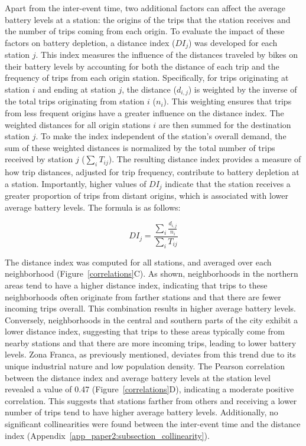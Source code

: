         Apart from the inter-event time, two additional factors can affect the average battery levels at a station: the origins of the trips that the station receives and the number of trips coming from each origin. To evaluate the impact of these factors on battery depletion, a distance index (\(DI_j\)) was developed for each station \( j \). This index measures the influence of the distances traveled by bikes on their battery levels by accounting for both the distance of each trip and the frequency of trips from each origin station. Specifically, for trips originating at station \( i \) and ending at station \( j \), the distance  (\( d_{i,j} \)) is weighted by the inverse of the total trips originating from station \( i \) (\( n_i \)). This weighting ensures that trips from less frequent origins have a greater influence on the distance index. The weighted distances for all origin stations \( i \) are then summed for the destination station \( j \). To make the index independent of the station’s overall demand, the sum of these weighted distances is normalized by the total number of trips received by station \( j \) (\( \sum_{i} T_{ij} \)). The resulting distance index provides a measure of how trip distances, adjusted for trip frequency, contribute to battery depletion at a station. Importantly, higher values of \(DI_j\) indicate that the station receives a greater proportion of trips from distant origins, which is associated with lower average battery levels. The formula is as follows:

        \begin{equation}
          DI_j = \frac{\sum_{i} \frac{d_{i,j}}{n_i}}{\sum_{i} T_{ij}}
        \end{equation}

        The distance index was computed for all stations, and averaged over each neighborhood (Figure~\ref{correlations}C). As shown, neighborhoods in the northern areas tend to have a higher distance index, indicating that trips to these neighborhoods often originate from farther stations and that there are fewer incoming trips overall. This combination results in higher average battery levels. Conversely, neighborhoods in the central and southern parts of the city exhibit a lower distance index, suggesting that trips to these areas typically come from nearby stations and that there are more incoming trips, leading to lower battery levels. Zona Franca, as previously mentioned, deviates from this trend due to its unique industrial nature and low population density. The Pearson correlation between the distance index and average battery levels at the station level revealed a value of 0.47 (Figure~\ref{correlations}D), indicating a moderate positive correlation. This suggests that stations farther from others and receiving a lower number of trips tend to have higher average battery levels. Additionally, no significant collinearities were found between the inter-event time and the distance index (Appendix~\ref{app_paper2:subsection_collinearity}).


